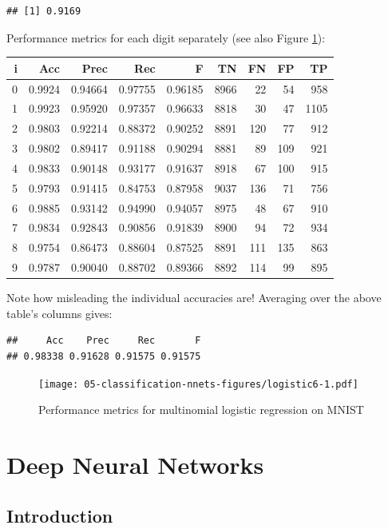 \documentclass[10pt,b5paper,krantz1]{krantz}
\begin{document}
\begin{verbatim}
## [1] 0.9169
\end{verbatim}

Performance metrics for each digit separately (see also Figure \ref{fig:logistic6}):

\begin{longtable}[]{@{}rrrrrrrrr@{}}
\toprule
i & Acc & Prec & Rec & F & TN & FN & FP & TP\tabularnewline
\midrule
\endhead
0 & 0.9924 & 0.94664 & 0.97755 & 0.96185 & 8966 & 22 & 54 & 958\tabularnewline
1 & 0.9923 & 0.95920 & 0.97357 & 0.96633 & 8818 & 30 & 47 & 1105\tabularnewline
2 & 0.9803 & 0.92214 & 0.88372 & 0.90252 & 8891 & 120 & 77 & 912\tabularnewline
3 & 0.9802 & 0.89417 & 0.91188 & 0.90294 & 8881 & 89 & 109 & 921\tabularnewline
4 & 0.9833 & 0.90148 & 0.93177 & 0.91637 & 8918 & 67 & 100 & 915\tabularnewline
5 & 0.9793 & 0.91415 & 0.84753 & 0.87958 & 9037 & 136 & 71 & 756\tabularnewline
6 & 0.9885 & 0.93142 & 0.94990 & 0.94057 & 8975 & 48 & 67 & 910\tabularnewline
7 & 0.9834 & 0.92843 & 0.90856 & 0.91839 & 8900 & 94 & 72 & 934\tabularnewline
8 & 0.9754 & 0.86473 & 0.88604 & 0.87525 & 8891 & 111 & 135 & 863\tabularnewline
9 & 0.9787 & 0.90040 & 0.88702 & 0.89366 & 8892 & 114 & 99 & 895\tabularnewline
\bottomrule
\end{longtable}

Note how misleading the individual accuracies are! Averaging over
the above table's columns gives:

\begin{verbatim}
##     Acc    Prec     Rec       F 
## 0.98338 0.91628 0.91575 0.91575
\end{verbatim}

\begin{figure}
\hypertarget{fig:logistic6}{%
\centering
\texttt{[image: 05-classification-nnets-figures/logistic6-1.pdf]}
\caption{Performance metrics for multinomial logistic regression on MNIST}\label{fig:logistic6}
}
\end{figure}

\hypertarget{deep-neural-networks}{%
\section{Deep Neural Networks}\label{deep-neural-networks}}

\hypertarget{introduction-8}{%
\subsection{Introduction}\label{introduction-8}}
\end{document}
